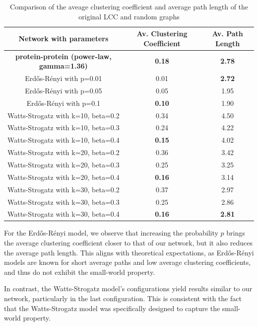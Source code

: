 \documentclass[paper=a4,fontsize=11pt,DIV=8,BCOR=5mm,oneside,pdftex,bibtotocnumbered]{scrreprt}
\theoremstyle{plain}
\begin{document}
	\begin{table}
		\caption{Comparison of the aveage clustering coefficient and average path length of the original LCC and random graphs}
		\centering
		\begin{tabular}{|c||c|c|}
			\hline
			Network with parameters& Av. Clustering Coefficient & Av. Path Length \\
			\hline
			\textbf{protein-protein (power-law, gamma=1.36)} & \textbf{0.18} & \textbf{2.78}\\
			\hline
			Erdős-Rényi with p=0.01 & 0.01 & \textbf{2.72} \\
			Erdős-Rényi with p=0.05 & 0.05 & 1.95 \\
			Erdős-Rényi with p=0.1 & \textbf{0.10} & 1.90 \\
			\hline
			Watts-Strogatz with k=10, beta=0.2 & 0.34& 4.50 \\
			Watts-Strogatz with k=10, beta=0.3 & 0.24 & 4.22 \\
			Watts-Strogatz with k=10, beta=0.4 & \textbf{0.15} & 4.02 \\
			Watts-Strogatz with k=20, beta=0.2 & 0.36 & 3.42 \\
			Watts-Strogatz with k=20, beta=0.3 & 0.25 & 3.25 \\
			Watts-Strogatz with k=20, beta=0.4 & \textbf{0.16 }& 3.14 \\
			Watts-Strogatz with k=30, beta=0.2 & 0.37 & 2.97 \\
			Watts-Strogatz with k=30, beta=0.3 & 0.25 & 2.86 \\
			Watts-Strogatz with k=30, beta=0.4 & \textbf{0.16} & \textbf{2.81} \\
			
			\hline
		\end{tabular}
		
		\label{tab:small-world-comp}
	\end{table}
	
	For the Erdős-Rényi model, we observe that increasing the probability \( p \) brings the average clustering coefficient closer to that of our network, but it also reduces the average path length. This aligns with theoretical expectations, as Erdős-Rényi models are known for short average paths and low average clustering coefficients, and thus do not exhibit the small-world property.
	
	In contrast, the Watts-Strogatz model's configurations yield results similar to our network, particularly in the last configuration. This is consistent with the fact that the Watts-Strogatz model was specifically designed to capture the small-world property.
	
\end{document}
